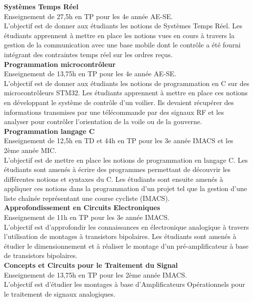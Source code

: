 \documentclass[11pt,a4paper,sans]{moderncv}         %
\begin{document}
{
  \textbf{Syst\`emes Temps R\'eel}\\
  Enseignement de 27,5h en TP pour les 4e ann\'ee AE-SE.\\
  L'objectif est de donner aux \'etudiants les notions de Syst\`emes Temps R\'eel.
  Les \'etudiants apprennent \`a mettre en place les notions vues en cours \`a travers la gestion de la communication avec une base mobile dont le contr\^ole a \'et\'e fourni int\'egrant des contraintes temps r\'eel sur les ordres re\c cus.\\
  \textbf{Programmation microcontr\^oleur}\\
  Enseignement de 13,75h en TP pour les 4e ann\'ee AE-SE.\\
  L'objectif est de donner aux \'etudiants les notions de programmation en C sur des microcontr\^oleurs STM32.
  Les \'etudiants apprennent \`a mettre en place ces notions en d\'eveloppant le syst\`eme de contr\^ole d'un voilier.
  Ils devaient r\'ecup\'erer des informations transmises par une t\'el\'ecommande par des signaux RF et les analyser pour contr\^oler l'orientation de la voile ou de la gouverne.\\
  \textbf{Programmation langage C}\\
  Enseignement de 12,5h en TD et 44h en TP pour les 3e ann\'ee IMACS et les 2\`eme ann\'ee MIC.\\
  L'objectif est de mettre en place les notions de programmation en langage C.
  Les \'etudiants sont amen\'es \`a \'ecrire des programmes permettant de d\'ecouvrir les diff\'erentes notions et syntaxes du C.
  Les \'etudiants sont ensuite amen\'es \`a appliquer ces notions dans la programmation d'un projet tel que la gestion d'une liste cha\^in\'ee repr\'esentant une course cycliste (IMACS).\\
  \textbf{Approfondissement en Circuits Electroniques}\\
  Enseignement de 11h en TP pour les 3e ann\'ee IMACS.\\
  L'objectif est d'approfondir les connaissances en \'electronique analogique \`a travers l'utilisation de montages \`a transistors bipolaires.
  Les \'etudiants sont amen\'es \`a \'etudier le dimensionnement et \`a r\'ealiser le montage d'un pr\'e-amplificateur \`a base de transistors bipolaires.\\
  \textbf{Concepts et Circuits pour le Traitement du Signal}\\
  Enseignement de 13,75h en TP pour les 2\`eme ann\'ee IMACS.\\
  L'objectif est d'\'etudier les montages \`a base d'Amplificateurs Op\'erationnels pour le traitement de signaux analogiques.
}
\end{document}
